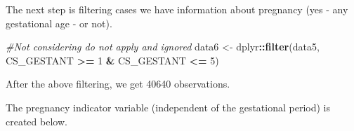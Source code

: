 \documentclass[
]{article}
\newenvironment{Shaded}{\begin{snugshade}}{\end{snugshade}}
\newcommand{\CommentTok}[1]{\textcolor[rgb]{0.56,0.35,0.01}{\textit{#1}}}
\newcommand{\DataTypeTok}[1]{\textcolor[rgb]{0.13,0.29,0.53}{#1}}
\newcommand{\DecValTok}[1]{\textcolor[rgb]{0.00,0.00,0.81}{#1}}
\newcommand{\KeywordTok}[1]{\textcolor[rgb]{0.13,0.29,0.53}{\textbf{#1}}}
\newcommand{\NormalTok}[1]{#1}
\newcommand{\OperatorTok}[1]{\textcolor[rgb]{0.81,0.36,0.00}{\textbf{#1}}}
\newcommand{\OtherTok}[1]{\textcolor[rgb]{0.56,0.35,0.01}{#1}}
\newcommand{\StringTok}[1]{\textcolor[rgb]{0.31,0.60,0.02}{#1}}
\begin{document}
The next step is filtering cases we have information about pregnancy
(yes - any gestational age - or not).

\begin{Shaded}
\begin{Highlighting}[]
\CommentTok{#Not considering do not apply and ignored}
\NormalTok{data6 <-}\StringTok{ }\NormalTok{dplyr}\OperatorTok{::}\KeywordTok{filter}\NormalTok{(data5, CS_GESTANT }\OperatorTok{>=}\StringTok{ }\DecValTok{1} \OperatorTok{&}\StringTok{ }\NormalTok{CS_GESTANT }\OperatorTok{<=}\StringTok{ }\DecValTok{5}\NormalTok{)}
\end{Highlighting}
\end{Shaded}

After the above filtering, we get 40640 observations.

The pregnancy indicator variable (independent of the gestational period)
is created below.

\begin{Shaded}
\end{Shaded}

\begin{Shaded}
\end{Shaded}
\end{document}
